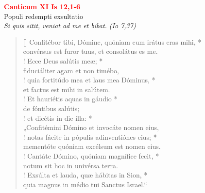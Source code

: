 


\def\greinitialformat#1{%
{\fontsize{39}{39}\selectfont #1}%
}




\vspace{0.3cm}
\begin{center}
 \textcolor{red}{\large \bf Canticum XI Is 12,1-6}\\
Populi redempti exsultatio\\
\textit{\small Si quis sitit, veniat ad me et bibat. (Io 7,37)}
\end{center}
\begin{verse}[\versewidth]
Confitébor tibi, Dómine, quóniam cum irátus eras mihi, *\\
convérsus est furor tuus, et consolátus es me.\\!
\vin Ecce Deus salútis meæ; *\\
\vin fiduciáliter agam et non timébo,\\!
quia fortitúdo mea et laus mea Dóminus, *\\
et factus est mihi in salútem.\\!
\vin Et hauriétis aquas in gáudio *\\
\vin de fóntibus salútis;\\!
et dicétis in die illa: *\\
„Confitémini Dómino et invocáte nomen eius,\\!
\vin notas fácite in pópulis adinventiónes eius; *\\
\vin mementóte quóniam excélsum est nomen eius.\\!
Cantáte Dómino, quóniam magnífice fecit, *\\
notum sit hoc in univérsa terra.\\!
\vin Exsúlta et lauda, quæ hábitas in Sion, *\\
\vin quia magnus in médio tui Sanctus Israel.“\\
\end{verse}
\vspace{1cm}


